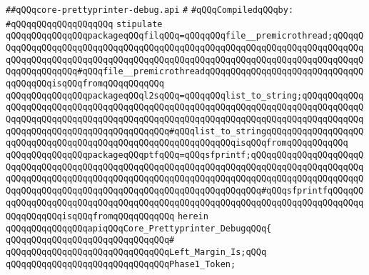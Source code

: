 \label{src/lib/prettyprint/big/src/core-prettyprinter-debug.api}
\verb|##qQQqcore-prettyprinter-debug.api|\newline
\verb|#|\newline
\newline
\verb|#qQQqCompiledqQQqby:|\newline
\verb|#qQQqqQQqqQQqqQQqqQQq|\newline
\newline
\verb|stipulate|\newline
\verb|qQQqqQQqqQQqqQQqpackageqQQqfilqQQq=qQQqqQQqfile__premicrothread;qQQqqQQqqQQqqQQqqQQqqQQqqQQqqQQqqQQqqQQqqQQqqQQqqQQqqQQqqQQqqQQqqQQqqQQqqQQqqQQqqQQqqQQqqQQqqQQqqQQqqQQqqQQqqQQqqQQqqQQqqQQqqQQqqQQqqQQqqQQqqQQqqQQqqQQqqQQqqQQq#qQQqfile__premicrothreadqQQqqQQqqQQqqQQqqQQqqQQqqQQqqQQqqQQqqQQqisqQQqfromqQQqqQQqqQQq|\newline
\verb|qQQqqQQqqQQqqQQqpackageqQQql2sqQQq=qQQqqQQqlist_to_string;qQQqqQQqqQQqqQQqqQQqqQQqqQQqqQQqqQQqqQQqqQQqqQQqqQQqqQQqqQQqqQQqqQQqqQQqqQQqqQQqqQQqqQQqqQQqqQQqqQQqqQQqqQQqqQQqqQQqqQQqqQQqqQQqqQQqqQQqqQQqqQQqqQQqqQQqqQQqqQQqqQQqqQQqqQQqqQQqqQQqqQQq#qQQqlist_to_stringqQQqqQQqqQQqqQQqqQQqqQQqqQQqqQQqqQQqqQQqqQQqqQQqqQQqqQQqqQQqqQQqisqQQqfromqQQqqQQqqQQq|\newline
\verb|qQQqqQQqqQQqqQQqpackageqQQqptfqQQq=qQQqsfprintf;qQQqqQQqqQQqqQQqqQQqqQQqqQQqqQQqqQQqqQQqqQQqqQQqqQQqqQQqqQQqqQQqqQQqqQQqqQQqqQQqqQQqqQQqqQQqqQQqqQQqqQQqqQQqqQQqqQQqqQQqqQQqqQQqqQQqqQQqqQQqqQQqqQQqqQQqqQQqqQQqqQQqqQQqqQQqqQQqqQQqqQQqqQQqqQQqqQQqqQQqqQQqqQQqqQQq#qQQqsfprintfqQQqqQQqqQQqqQQqqQQqqQQqqQQqqQQqqQQqqQQqqQQqqQQqqQQqqQQqqQQqqQQqqQQqqQQqqQQqqQQqqQQqqQQqisqQQqfromqQQqqQQqqQQq|\newline
\verb|herein|\newline
\newline
\verb|qQQqqQQqqQQqqQQqapiqQQqCore_Prettyprinter_DebugqQQq{|\newline
\verb|qQQqqQQqqQQqqQQqqQQqqQQqqQQqqQQq#|\newline
\verb|qQQqqQQqqQQqqQQqqQQqqQQqqQQqqQQqLeft_Margin_Is;qQQq|\newline
\verb|qQQqqQQqqQQqqQQqqQQqqQQqqQQqqQQqPhase1_Token;|\newline
